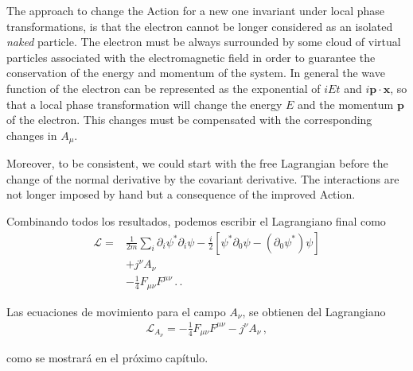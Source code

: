 The approach to change the Action for a new one invariant under local phase  transformations, is that the electron cannot be longer considered as an isolated \emph{naked} particle. The electron must be always surrounded by some cloud of virtual particles associated with the electromagnetic field in order to guarantee the conservation of the energy and momentum of the system. In general the wave function of the electron can be represented as the exponential of $iEt$ and $i \mathbf{p}\cdot \mathbf{x}$, so that a local phase transformation will change the energy $E$ and the momentum $\mathbf{p}$ of the electron. This changes must be compensated with the corresponding changes in $A_{\mu}$.

Moreover, to be consistent, we could start with the free Lagrangian before the change of the normal derivative by the covariant derivative. The interactions are not longer imposed by hand but a consequence of the improved Action. 

\begin{frame}
Combinando todos los resultados, podemos escribir el Lagrangiano final como %
\begin{align}
  \mathcal{L}=&\frac{1}{2m}\sum_i\partial_i\psi^*\partial_i\psi
-\frac{i}{2}
  \left[\psi^*\partial_0\psi-(\partial_0\psi^*)\psi\right] \nonumber\\
&+j^\nu A_\nu\nonumber\\
 &-\frac{1}{4}F_{\mu\nu}F^{\mu\nu}\,.\,.
\end{align}

Las ecuaciones de movimiento para el campo $A_\nu$, se obtienen del Lagrangiano
\begin{align}
\mathcal{L}_{A_\nu} = -\frac{1}{4}F_{\mu\nu}F^{\mu\nu} - j^\nu A_\nu\,,
\end{align}
\end{frame}
como se mostrará en el próximo capítulo.

